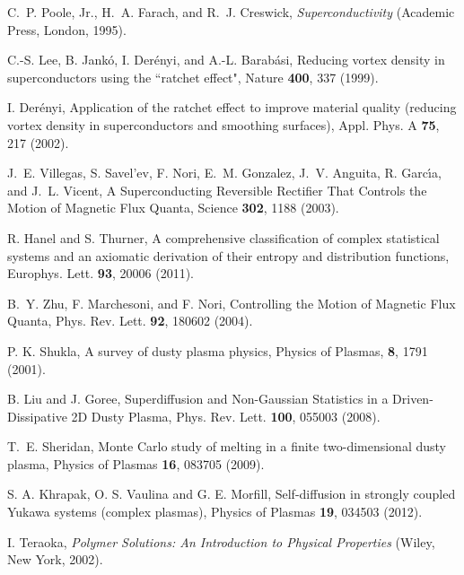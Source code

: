 \documentclass[showpacs,preprintnumbers,amsmath,amssymb,eqsecnum]{revtex4}
\begin{document}
\begin{thebibliography}{99}
C.~P. Poole, Jr., H.~A. Farach, and R.~J. Creswick, {\it Superconductivity}
(Academic Press, London, 1995).

C.-S. Lee, B. Jank\'o, I. Der\'enyi, and A.-L. Barab\'asi,
Reducing vortex density in superconductors using the ``ratchet effect",
Nature {\bf 400}, 337 (1999).

I. Der\'enyi, Application of the ratchet effect to improve material
quality (reducing vortex density in superconductors and smoothing surfaces),
Appl. Phys. A {\bf 75}, 217 (2002).

J.~E. Villegas, S. Savel'ev, F. Nori, E.~M. Gonzalez,
J.~V. Anguita, R. Garc\'{\i}a, and J.~L. Vicent, A Superconducting Reversible
Rectifier That Controls the Motion of Magnetic Flux Quanta,
Science {\bf 302}, 1188 (2003).

R. Hanel and S. Thurner, A comprehensive classification of complex
statistical systems and an axiomatic derivation of their entropy and
distribution functions, Europhys. Lett. {\bf 93}, 20006 (2011).

B.~Y. Zhu, F. Marchesoni, and F. Nori,
Controlling the Motion of Magnetic Flux Quanta,
Phys. Rev. Lett. {\bf 92}, 180602 (2004).

P. K. Shukla, A survey of dusty plasma physics,
Physics of Plasmas, {\bf 8}, 1791 (2001).

B. Liu and J. Goree, Superdiffusion and Non-Gaussian Statistics in
a Driven-Dissipative 2D Dusty Plasma,
Phys. Rev. Lett. {\bf 100}, 055003 (2008).

T.~E. Sheridan, Monte Carlo study of melting in a finite two-dimensional
dusty plasma,
Physics of Plasmas {\bf 16}, 083705 (2009).

S. A. Khrapak, O. S. Vaulina and G. E. Morfill,
Self-diffusion in strongly coupled Yukawa systems (complex plasmas),
Physics of Plasmas {\bf 19}, 034503 (2012).

I. Teraoka, {\it Polymer Solutions: An Introduction to Physical Properties}
(Wiley, New York, 2002).

\end{thebibliography}
\end{document}
